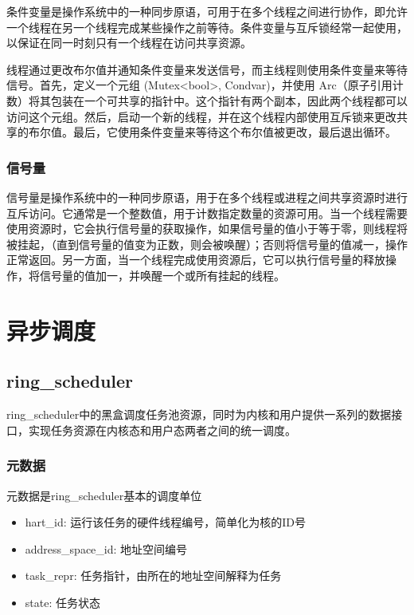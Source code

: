 条件变量是操作系统中的一种同步原语，可用于在多个线程之间进行协作，即允许一个线程在另一个线程完成某些操作之前等待。条件变量与互斥锁经常一起使用，以保证在同一时刻只有一个线程在访问共享资源。

线程通过更改布尔值并通知条件变量来发送信号，而主线程则使用条件变量来等待信号。首先，定义一个元组 (Mutex<bool>, Condvar)，并使用 Arc（原子引用计数）将其包装在一个可共享的指针中。这个指针有两个副本，因此两个线程都可以访问这个元组。然后，启动一个新的线程，并在这个线程内部使用互斥锁来更改共享的布尔值。最后，它使用条件变量来等待这个布尔值被更改，最后退出循环。

\subsubsection{信号量}

信号量是操作系统中的一种同步原语，用于在多个线程或进程之间共享资源时进行互斥访问。它通常是一个整数值，用于计数指定数量的资源可用。当一个线程需要使用资源时，它会执行信号量的获取操作，如果信号量的值小于等于零，则线程将被挂起，（直到信号量的值变为正数，则会被唤醒）；否则将信号量的值减一，操作正常返回。另一方面，当一个线程完成使用资源后，它可以执行信号量的释放操作，将信号量的值加一，并唤醒一个或所有挂起的线程。

\section{异步调度}

\subsection{ring\_scheduler}


ring\_scheduler中的黑盒调度任务池资源，同时为内核和用户提供一系列的数据接口，实现任务资源在内核态和用户态两者之间的统一调度。

\subsubsection{元数据}

元数据是ring\_scheduler基本的调度单位

\begin{itemize}
\item hart\_id: 运行该任务的硬件线程编号，简单化为核的ID号
\item address\_space\_id: 地址空间编号
\item task\_repr: 任务指针，由所在的地址空间解释为任务
\item state: 任务状态
\end{itemize}


